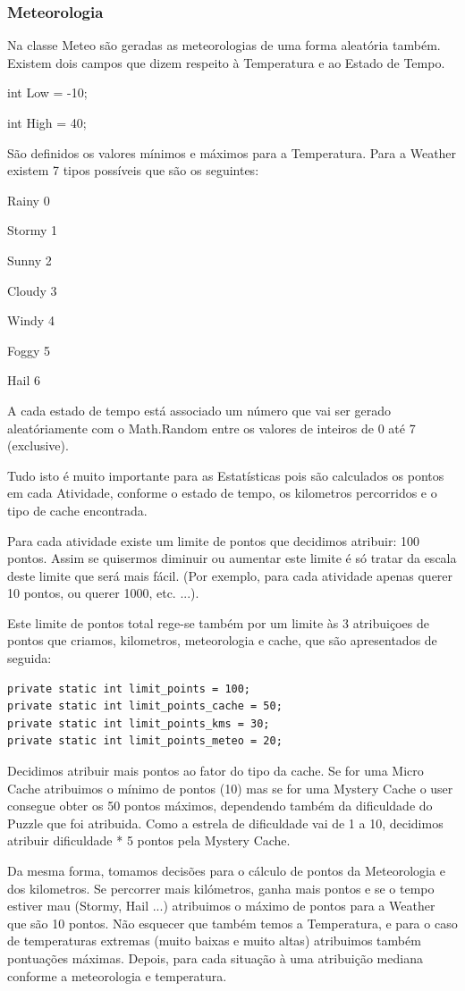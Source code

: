 \documentclass{article}
\begin{document}
\subsubsection{Meteorologia}
\quad  Na classe Meteo são geradas as meteorologias de uma forma aleatória também. Existem dois campos que dizem respeito à Temperatura e ao Estado de Tempo. 
\par int Low = -10;
\par int High = 40;
\par São definidos os valores mínimos e máximos para a Temperatura. Para a Weather existem 7 tipos possíveis que são os seguintes:
\par Rainy 0
\par Stormy 1
\par Sunny 2
\par Cloudy 3
\par Windy 4
\par Foggy 5
\par Hail 6
\par A cada estado de tempo está associado um número que vai ser gerado aleatóriamente com o Math.Random entre os valores de inteiros de 0 até 7 (exclusive).
\\

\par Tudo isto é muito importante para as Estatísticas pois são calculados os pontos em cada Atividade, conforme o estado de tempo, os kilometros percorridos e o tipo de cache encontrada. 
\par Para cada atividade existe um limite de pontos que decidimos atribuir: 100 pontos. Assim se quisermos diminuir ou aumentar este limite é só tratar da escala deste limite que será mais fácil. (Por exemplo, para cada atividade apenas querer 10 pontos, ou querer 1000, etc. ...).
\par Este limite de pontos total rege-se também por um limite às 3 atribuiçoes de pontos que criamos,  kilometros, meteorologia e cache, que são apresentados de seguida:
\begin{lstlisting}
private static int limit_points = 100;
private static int limit_points_cache = 50;
private static int limit_points_kms = 30;
private static int limit_points_meteo = 20;
\end{lstlisting}

\par * Decidimos atribuir mais pontos ao fator do tipo da cache. Se for uma Micro Cache atribuimos o mínimo de pontos (10) mas se for uma Mystery Cache o user consegue obter os 50 pontos máximos, dependendo também da dificuldade do Puzzle que foi atribuida. Como a estrela de dificuldade vai de 1 a 10, decidimos atribuir dificuldade * 5 pontos pela Mystery Cache.
\par Da mesma forma, tomamos decisões para o cálculo de pontos da Meteorologia e dos kilometros. Se percorrer mais kilómetros, ganha mais pontos e se o tempo estiver mau (Stormy, Hail ...) atribuimos o máximo de pontos para a Weather que são 10 pontos. Não esquecer que também temos a Temperatura, e para o caso de temperaturas extremas (muito baixas e muito altas) atribuimos também pontuações máximas. Depois, para cada situação à uma atribuição mediana conforme a meteorologia e temperatura.
\end{document}
